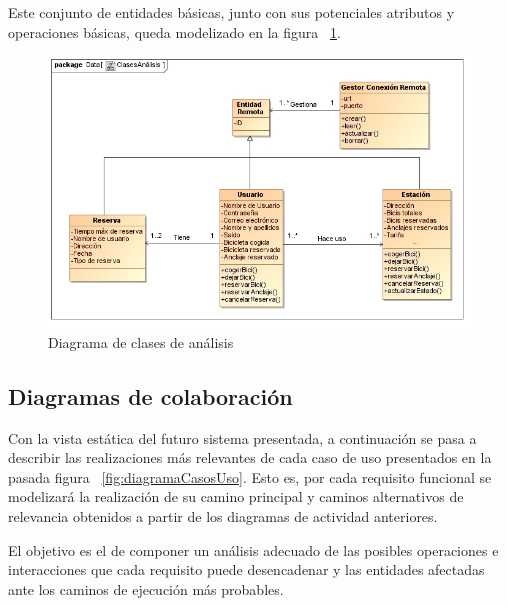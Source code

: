 Este conjunto de entidades básicas, junto con sus potenciales atributos y operaciones básicas, queda modelizado en la figura ~\ref{fig:diagramaClasesAnalisis}.

\begin{figure}
	\centering
	\includegraphics[width=\linewidth,height=\textheight,keepaspectratio]{Images/Diagramas/03_ClasesAnalisis}
	\caption{Diagrama de clases de análisis}
	\label{fig:diagramaClasesAnalisis}
\end{figure}

\subsection{Diagramas de colaboración}

Con la vista estática del futuro sistema presentada, a continuación se pasa a describir las realizaciones más relevantes de cada caso de uso presentados en la pasada figura ~\ref{fig:diagramaCasosUso}. Esto es, por cada requisito funcional se modelizará la realización de su camino principal y caminos alternativos de relevancia obtenidos a partir de los diagramas de actividad anteriores.

El objetivo es el de componer un análisis adecuado de las posibles operaciones e interacciones que cada requisito puede desencadenar y las entidades afectadas ante los caminos de ejecución más probables.

